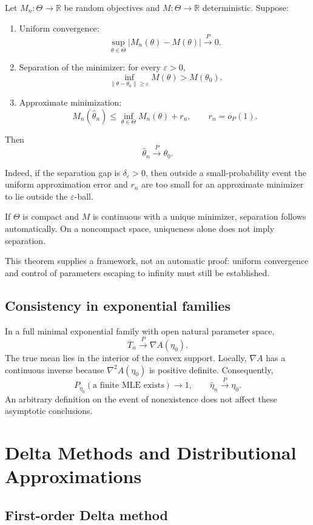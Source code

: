 Let $M_n:\Theta\to\mathbb R$ be random objectives and
$M:\Theta\to\mathbb R$ deterministic. Suppose:
\begin{enumerate}
\item Uniform convergence:
\[
\sup_{\theta\in\Theta}|M_n(\theta)-M(\theta)|
\xrightarrow{P}0.
\]

\item Separation of the minimizer: for every $\varepsilon>0$,
\[
\inf_{\|\theta-\theta_0\|\geq\varepsilon}M(\theta)
>
M(\theta_0).
\]

\item Approximate minimization:
\[
M_n(\widehat\theta_n)
\leq \inf_{\theta\in\Theta}M_n(\theta)+r_n,
\qquad r_n=o_P(1).
\]
\end{enumerate}
Then
\[
\widehat\theta_n\xrightarrow{P}\theta_0.
\]

Indeed, if the separation gap is $\delta_\varepsilon>0$, then
outside a small-probability event the uniform approximation error
and $r_n$ are too small for an approximate minimizer to lie outside
the $\varepsilon$-ball.

If $\Theta$ is compact and $M$ is continuous with a unique
minimizer, separation follows automatically. On a noncompact space,
uniqueness alone does not imply separation.

This theorem supplies a framework, not an automatic proof:
uniform convergence and control of parameters escaping to infinity
must still be established.

\subsection{Consistency in exponential families}

In a full minimal exponential family with open natural parameter
space,
\[
\overline T_n\xrightarrow{P}\nabla A(\eta_0).
\]
The true mean lies in the interior of the convex support.
Locally, $\nabla A$ has a continuous inverse because
$\nabla^2A(\eta_0)$ is positive definite. Consequently,
\[
P_{\eta_0}(\text{a finite MLE exists})\longrightarrow1,
\qquad
\widehat\eta_n\xrightarrow{P}\eta_0.
\]
An arbitrary definition on the event of nonexistence does not
affect these asymptotic conclusions.

\section{Delta Methods and Distributional Approximations}

\subsection{First-order Delta method}

